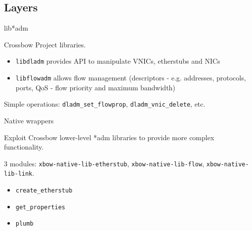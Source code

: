 \documentclass{beamer}
\begin{document}
	\subsection{Layers}

		\begin{frame}{lib*adm}

			Crossbow Project libraries.

			\begin{itemize}
				\item \texttt{libdladm} provides API to manipulate VNICs, etherstubs and NICs
				\item \texttt{libflowadm} allows flow management (descriptors - e.g. addresses, protocols, ports, QoS - flow priority and maximum bandwidth)
			\end{itemize}

			Simple operations: \texttt{dladm\_set\_flowprop}, \texttt{dladm\_vnic\_delete}, etc.

		\end{frame}
	

		\begin{frame}{Native wrappers}

			Exploit Crossbow lower-level *adm libraries to provide more complex functionality.
			
			\medskip

			3 modules: \texttt{xbow-native-lib-etherstub}, \texttt{xbow-native-lib-flow}, \texttt{xbow-native-lib-link}.

			\begin{itemize}
				\item \texttt{create\_etherstub}
				\item \texttt{get\_properties}
				\item \texttt{plumb}
			\end{itemize}

		\end{frame}
	
\end{document}
